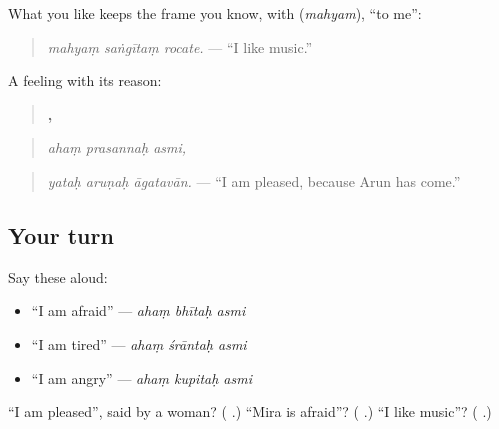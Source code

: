 What you like keeps the frame you know, with \textbf{} (\emph{mahyam}), \textquotedblleft{}to me\textquotedblright{}:

\begin{quote}
\textbf{  }
\end{quote}

\begin{quote}
\emph{mahyaṃ saṅgītaṃ rocate.} — \textquotedblleft{}I like music.\textquotedblright{}
\end{quote}

A feeling with its reason:

\begin{quote}
\textbf{  ,}
\end{quote}

\begin{quote}
\emph{ahaṃ prasannaḥ asmi,}
\end{quote}

\begin{quote}
\textbf{  }
\end{quote}

\begin{quote}
\emph{yataḥ aruṇaḥ āgatavān.} — \textquotedblleft{}I am pleased, because Arun has come.\textquotedblright{}
\end{quote}

\subsection*{Your turn}
Say these aloud:

\begin{itemize}
\raggedright
  \item \textquotedblleft{}I am afraid\textquotedblright{} — \emph{ahaṃ bhītaḥ asmi}
  \item \textquotedblleft{}I am tired\textquotedblright{} — \emph{ahaṃ śrāntaḥ asmi}
  \item \textquotedblleft{}I am angry\textquotedblright{} — \emph{ahaṃ kupitaḥ asmi}
\end{itemize}

\begin{tcolorbox}[breakable,colback=teal!4,colframe=teal!35!black,title={Before you move on}]
\textquotedblleft{}I am pleased\textquotedblright{}, said by a woman? (\textbf{  }.) \textquotedblleft{}Mira is afraid\textquotedblright{}? (\textbf{  }.) \textquotedblleft{}I like music\textquotedblright{}? (\textbf{  }.)
\end{tcolorbox}
